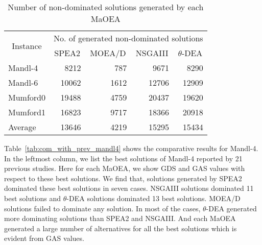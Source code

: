 \begin{table}[htbp]
	\centering
	\caption{Number of non-dominated solutions generated by each MaOEA}
	\begin{tabular}{|l|r|r|r|r|}
		\hline
		\multicolumn{1}{|c|}{\multirow{2}[4]{*}{Instance}} & \multicolumn{4}{c|}{No. of generated non-dominated solutions} \\
		\cline{2-5}    \multicolumn{1}{|c|}{} & \multicolumn{1}{c|}{SPEA2} & \multicolumn{1}{c|}{MOEA/D} & \multicolumn{1}{c|}{NSGAIII} & \multicolumn{1}{c|}{$\theta$-DEA} \\
		\hline
		Mandl-4 & 8212  & 787   & 9671  & 8290 \\
		\hline
		Mandl-6 & 10062 & 1612  & 12706 & 12909 \\
		\hline
		Mumford0 & 19488 & 4759  & 20437 & 19620 \\
		\hline
		Mumford1 & 16823 & 9717  & 18366 & 20918 \\
		\hline
		\hline
		Average & 13646 & 4219  & 15295 & 15434 \\
		\hline
	\end{tabular}%
	\label{tab:rf_size}%
\end{table}%

Table~\ref{tab:com_with_prev_mandl4} shows the comparative results for Mandl-4. In the leftmost column, we list the best solutions of Mandl-4 reported by 21 previous studies. Here for each MaOEA, we show GDS and GAS values with respect to these best solutions. We find that, solutions generated by SPEA2 dominated these best solutions in seven cases. NSGAIII solutions dominated 11 best solutions and $\theta$-DEA solutions dominated 13 best solutions. MOEA/D solutions failed to dominate any solution. In most of the cases, $\theta$-DEA generated more dominating solutions than SPEA2 and NSGAIII. And each MaOEA generated a large number of alternatives for all the best solutions which is evident from GAS values.

